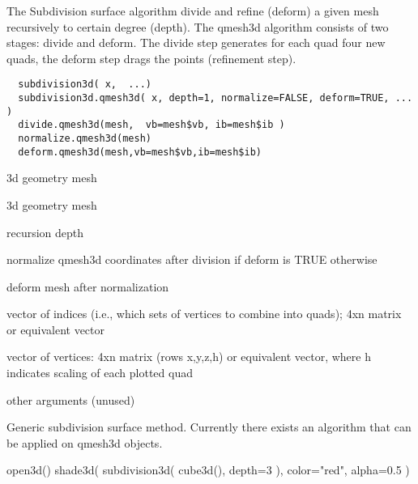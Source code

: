\documentclass{article}
\begin{document}
\begin{Description}\relax
The Subdivision surface algorithm divide and refine (deform) a
given mesh recursively to certain degree (depth).
The qmesh3d algorithm consists of two stages: divide and deform.
The divide step generates for each quad four new quads, the deform
step drags the points (refinement step).
\end{Description}
\begin{Usage}
\begin{verbatim}
  subdivision3d( x,  ...)
  subdivision3d.qmesh3d( x, depth=1, normalize=FALSE, deform=TRUE, ... )
  divide.qmesh3d(mesh,  vb=mesh$vb, ib=mesh$ib )
  normalize.qmesh3d(mesh)
  deform.qmesh3d(mesh,vb=mesh$vb,ib=mesh$ib)
\end{verbatim}
\end{Usage}
\begin{Arguments}
\begin{ldescription}
\item[\code{x}] 3d geometry mesh
\item[\code{mesh}] 3d geometry mesh
\item[\code{depth}] recursion depth
\item[\code{normalize}] normalize qmesh3d coordinates after division if deform is TRUE otherwise
\item[\code{deform}] deform mesh after normalization
\item[\code{ib}] vector of indices (i.e., which sets of vertices to combine
into quads); 4xn matrix or equivalent vector
\item[\code{vb}] vector of vertices: 4xn matrix (rows x,y,z,h) or equivalent
vector, where h indicates scaling of each plotted quad
\item[\code{...}] other arguments (unused)
\end{ldescription}
\end{Arguments}
\begin{Details}\relax
Generic subdivision surface method. Currently there exists
an algorithm that can be applied on qmesh3d objects.
\end{Details}
\begin{SeeAlso}\relax
{}
\end{SeeAlso}
\begin{Examples}
\begin{ExampleCode}
  open3d()
  shade3d( subdivision3d( cube3d(), depth=3 ), color="red", alpha=0.5 )
\end{ExampleCode}
\end{Examples}
\end{document}
